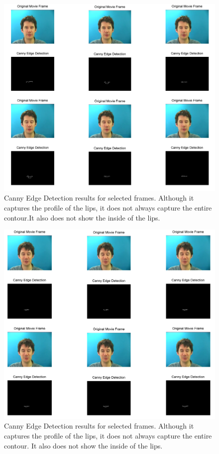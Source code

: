 \documentclass{article}
\begin{document}
\begin{figure}
	\centering
	\includegraphics[width=1\textwidth]{canny1.png}
	\caption{Canny Edge Detection results for selected frames. Although it captures the profile of the lips, it does not always capture the entire contour.It also does not show the inside of the lips.}
\end{figure}

\begin{figure}
	\centering
	\includegraphics[width=1\textwidth]{canny2.png}
	\caption{Canny Edge Detection results for selected frames. Although it captures the profile of the lips, it does not always capture the entire contour. It also does not show the inside of the lips.}
\end{figure}
\end{document}
